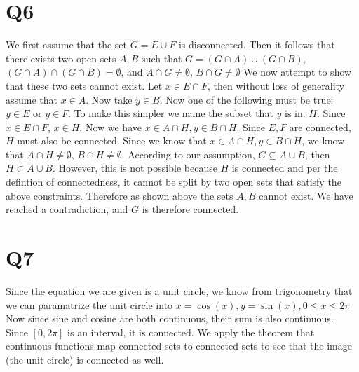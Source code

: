 \documentclass[12pt]{article}
\begin{document}
\section{Q6}
We first assume that the set $G = E \cup F$ is disconnected. Then it follows that there exists two open sets $A,B$ such that $G = (G \cap A) \cup (G \cap B)$, $ (G \cap A) \cap (G \cap B) = \emptyset$, and $A \cap G \not = \emptyset$, $B \cap G \not = \emptyset$
\newline
We now attempt to show that these two sets cannot exist.
\newline
Let $x \in E \cap F$, then without loss of generality assume that $x \in A$. Now take $y \in B$. Now one of the following must be true: $y \in E$ or $y \in F$. To make this simpler we name the subset that $y$ is in: $H$. Since $x \in E \cap F$, $x \in H$. Now we have $x \in A \cap H, y \in B \cap H$.
\newline
Since $E, F$ are connected, $H$ must also be connected. Since we know that $x \in A \cap H, y \in B \cap H$, we know that $A \cap H \not = \emptyset$, $B \cap H \not = \emptyset$. According to our assumption, $G \subseteq A \cup B$, then $H \subset A \cup B$. However, this is not possible because $H$ is connected and per the defintion of connectedness, it cannot be split by two open sets that satisfy the above constraints.
\newline
Therefore as shown above the sets $A, B$ cannot exist. We have reached a contradiction, and $G$ is therefore connected.
\newpage


\section{Q7}
Since the equation we are given is a unit circle, we know from trigonometry that we can paramatrize the unit circle into $x=\cos(x), y=\sin(x), 0 \leq x \leq 2\pi$
\newline
Now since sine and cosine are both continuous, their sum is also continuous. Since $[0, 2\pi]$ is an interval, it is connected. We apply the theorem that continuous functions map connected sets to connected sets to see that the image (the unit circle) is connected as well.
\end{document}
